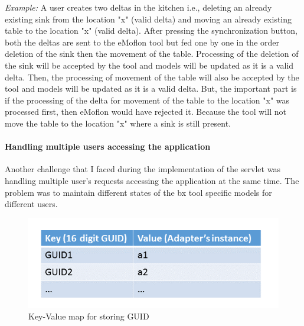 \textit{Example:} A user creates two deltas in the kitchen i.e., deleting an already existing sink from the location "x" (valid delta) and moving an already existing table to the location "x" (valid delta). After pressing the synchronization button, both the deltas are sent to the eMoflon tool but fed one by one in the order deletion of the sink then the movement of the table. Processing of the deletion of the sink will be accepted by the tool and models will be updated as it is a valid delta. Then, the processing of movement of the table will also be accepted by the tool and models will be updated as it is a valid delta. But, the important part is if the processing of the delta for movement of the table to the location "x" was processed first, then eMoflon would have rejected it. Because the tool will not move the table to the location "x" where a sink is still present.

\paragraph{Handling multiple users accessing the application}
Another challenge that I faced during the implementation of the servlet was handling multiple user's requests accessing the application at the same time. The problem was to maintain different states of the bx tool specific models for different users. 

\begin{figure}
	\centering
	\includegraphics[width=1\textwidth]{figures/Keyvalue_map}
	\caption{Key-Value map for storing GUID}
	\label{fig:Keyvalue_map}
\end{figure}

